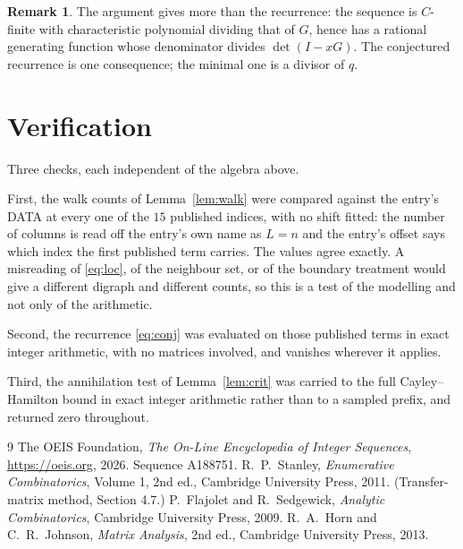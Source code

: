 \documentclass[11pt,a4paper]{article}
\theoremstyle{plain}
\theoremstyle{definition}
\newtheorem{remark}[theorem]{Remark}
\begin{document}
\begin{remark}
The argument gives more than the recurrence: the sequence is $C$-finite with characteristic
polynomial dividing that of $G$, hence has a rational generating function whose denominator
divides $\det(I-xG)$. The conjectured recurrence is one consequence; the minimal one is a
divisor of $q$.
\end{remark}

\section{Verification}

Three checks, each independent of the algebra above.

First, the walk counts of Lemma~\ref{lem:walk} were compared against the entry's DATA at
every one of the $15$ published indices, with no shift fitted: the number of columns is
read off the entry's own name as $L=n$ and the entry's offset says which index the first
published term carries. The values agree exactly. A misreading of \eqref{eq:loc}, of the
neighbour set, or of the boundary treatment would give a different digraph and different
counts, so this is a test of the modelling and not only of the arithmetic.

Second, the recurrence \eqref{eq:conj} was evaluated on those published terms in exact
integer arithmetic, with no matrices involved, and vanishes wherever it applies.

Third, the annihilation test of Lemma~\ref{lem:crit} was carried to the full
Cayley--Hamilton bound in exact integer arithmetic rather than to a sampled prefix, and
returned zero throughout.

\begin{thebibliography}{9}
 The OEIS Foundation, \emph{The On-Line Encyclopedia of Integer
Sequences}, \url{https://oeis.org}, 2026. Sequence A188751.
 R.~P.~Stanley, \emph{Enumerative Combinatorics}, Volume 1, 2nd ed.,
Cambridge University Press, 2011. (Transfer-matrix method, Section 4.7.)
 P.~Flajolet and R.~Sedgewick, \emph{Analytic Combinatorics}, Cambridge
University Press, 2009.
 R.~A.~Horn and C.~R.~Johnson, \emph{Matrix Analysis}, 2nd ed., Cambridge
University Press, 2013.
\end{thebibliography}
\end{document}
